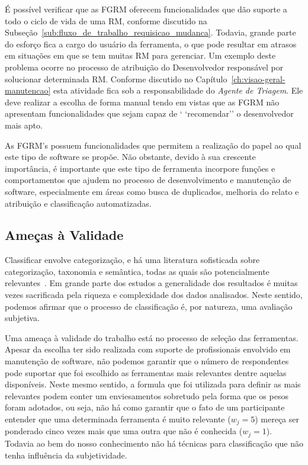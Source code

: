 É possível verificar que as FGRM oferecem funcionalidades que dão suporte a todo
o ciclo de vida de uma RM, conforme discutido na
Subseção~\ref{sub:fluxo_de_trabalho_requisicao_mudanca}. Todavia, grande parte
do esforço fica a cargo do usuário da ferramenta, o que pode resultar em atrasos
em situações em que se tem muitas RM para gerenciar. Um exemplo deste problema
ocorre no processo de atribuição do Desenvolvedor responsável por solucionar
determinada RM. Conforme discutido no Capítulo~\ref{ch:visao-geral-manutencao}
esta atividade fica sob a responsabilidade do \textit{Agente de Triagem}. Ele
deve realizar a escolha de forma manual tendo em vistas que as FGRM não
apresentam funcionalidades que sejam capaz de ` `recomendar'' o desenvolvedor
mais apto.

As FGRM's possuem funcionalidades que permitem a realização do papel ao qual
este tipo de software se propõe. Não obstante, devido à sua crescente
importância, é importante que este tipo de ferramenta incorpore funções e
comportamentos que ajudem no processo de desenvolvimento e manutenção de
software, especialmente em áreas como busca de duplicados, melhoria do relato e
atribuição e classificação automatizadas.

\subsection{Ameças à Validade}
\label{sec:ameacas_a_validade}

Classificar envolve categorização, e há uma literatura sofisticada sobre
categorização, taxonomia e semântica, todas as quais são potencialmente
relevantes~\cite{rugg2005sorting}. Em grande parte dos estudos a generalidade
dos resultados é muitas vezes sacrificada pela riqueza e complexidade dos dados
analisados. Neste sentido, podemos afirmar que o processo de classificação é,
por natureza, uma avaliação subjetiva.

Uma ameaça à validade do trabalho está no processo de seleção das ferramentas.
Apesar da escolha ter sido realizada com suporte de profissionais envolvido em
manutenção de software, não podemos garantir que o número de respondentes pode
suportar que foi escolhido as ferramentas mais relevantes dentre aquelas
disponíveis. Neste mesmo sentido, a formula que foi utilizada para definir as
mais relevantes podem conter um enviesamentos sobretudo pela forma que os pesos
foram adotados, ou seja, não há como garantir que o fato de um participante
entender que uma determinada ferramenta é muito relevante ($w_j = 5$) mereça ser
ponderado cinco vezes mais que uma outra que não é conhecida ($w_j = 1$).
Todavia ao bem do nosso conhecimento não há técnicas para classificação que não
tenha influência da subjetividade.

